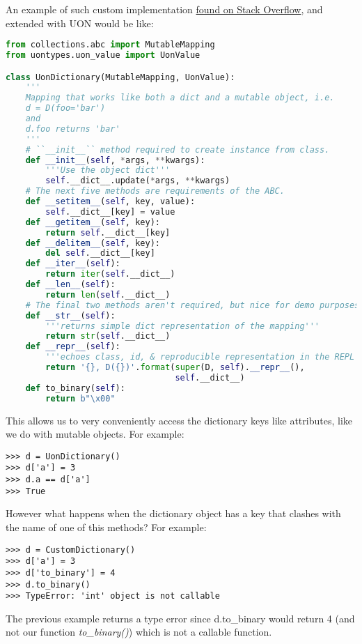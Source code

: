 \documentclass[12pt]{article}
\begin{document}
An example of such custom implementation \href{https://stackoverflow.com/questions/21361106/how-would-i-implement-a-dict-with-abstract-base-classes-in-python}{found on Stack Overflow}, and extended with UON would be like: 
\begin{lstlisting}[language=Python]
from collections.abc import MutableMapping
from uontypes.uon_value import UonValue

class UonDictionary(MutableMapping, UonValue):
    '''
    Mapping that works like both a dict and a mutable object, i.e.
    d = D(foo='bar')
    and 
    d.foo returns 'bar'
    '''
    # ``__init__`` method required to create instance from class.
    def __init__(self, *args, **kwargs):
        '''Use the object dict'''
        self.__dict__.update(*args, **kwargs)
    # The next five methods are requirements of the ABC.
    def __setitem__(self, key, value):
        self.__dict__[key] = value
    def __getitem__(self, key):
        return self.__dict__[key]
    def __delitem__(self, key):
        del self.__dict__[key]
    def __iter__(self):
        return iter(self.__dict__)
    def __len__(self):
        return len(self.__dict__)
    # The final two methods aren't required, but nice for demo purposes:
    def __str__(self):
        '''returns simple dict representation of the mapping'''
        return str(self.__dict__)
    def __repr__(self):
        '''echoes class, id, & reproducible representation in the REPL'''
        return '{}, D({})'.format(super(D, self).__repr__(), 
                                  self.__dict__)
    def to_binary(self):
        return b"\x00"
\end{lstlisting}

This allows us to very conveniently access the dictionary keys like attributes, like we do with mutable objects. For example:
\begin{lstlisting}
>>> d = UonDictionary()
>>> d['a'] = 3
>>> d.a == d['a']
>>> True
\end{lstlisting}

However what happens when the dictionary object has a key that clashes with the name of one of this methods? For example:
\begin{lstlisting}
>>> d = CustomDictionary()
>>> d['a'] = 3
>>> d['to_binary'] = 4
>>> d.to_binary()
>>> TypeError: 'int' object is not callable
\end{lstlisting}

The previous example returns a type error since d.to\_binary would return 4 (and not our function \emph{to\_binary()}) which is not a callable function.
\end{document}
